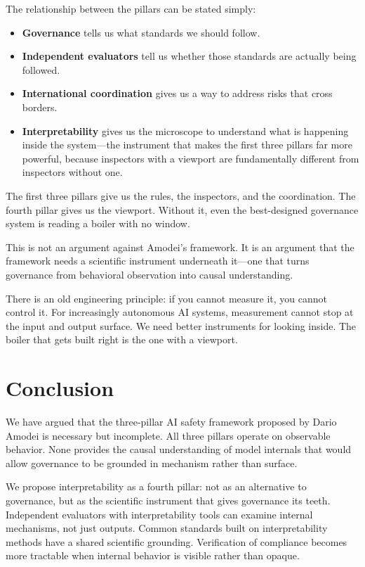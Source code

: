 \documentclass[12pt]{article}
\begin{document}
The relationship between the pillars can be stated simply:
\begin{itemize}[noitemsep]
  \item \textbf{Governance} tells us what standards we should follow.
  \item \textbf{Independent evaluators} tell us whether those standards are
    actually being followed.
  \item \textbf{International coordination} gives us a way to address risks
    that cross borders.
  \item \textbf{Interpretability} gives us the microscope to understand what
    is happening inside the system---the instrument that makes the first three
    pillars far more powerful, because inspectors with a viewport are
    fundamentally different from inspectors without one.
\end{itemize}

The first three pillars give us the rules, the inspectors, and the
coordination. The fourth pillar gives us the viewport. Without it, even the
best-designed governance system is reading a boiler with no window.

This is not an argument against Amodei's framework. It is an argument that
the framework needs a scientific instrument underneath it---one that turns
governance from behavioral observation into causal understanding.

There is an old engineering principle: if you cannot measure it, you cannot
control it. For increasingly autonomous AI systems, measurement cannot stop
at the input and output surface. We need better instruments for looking
inside. The boiler that gets built right is the one with a viewport.

\section{Conclusion}
\label{sec:conclusion}

We have argued that the three-pillar AI safety framework proposed by Dario
Amodei is necessary but incomplete. All three pillars operate on observable
behavior. None provides the causal understanding of model internals that
would allow governance to be grounded in mechanism rather than surface.

We propose interpretability as a fourth pillar: not as an alternative to
governance, but as the scientific instrument that gives governance its teeth.
Independent evaluators with interpretability tools can examine internal
mechanisms, not just outputs. Common standards built on interpretability
methods have a shared scientific grounding. Verification of compliance
becomes more tractable when internal behavior is visible rather than opaque.
\end{document}
